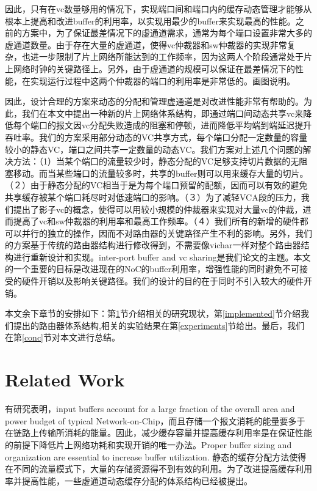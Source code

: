 ﻿\documentclass[10pt,journal]{IEEEtran}
\begin{document}
因此，只有在vc数量够用的情况下，实现端口间和端口内的缓存动态管理才能够从根本上提高和改进buffer的利用率，以实现用最少的buffer来实现最高的性能。之前的方案中\cite{NPKV06}\cite{4555894}\cite{5770788}\cite{Neishaburi:2009:RAN:1531542.1531658}\cite{6310960}，为了保证最差情况下的虚通道需求，通常为每个端口设置非常大多的虚通道数量。由于存在大量的虚通道，使得vc仲裁器和sw仲裁器的实现非常复杂，也进一步限制了片上网络所能达到的工作频率，因为这两人个阶段通常处于片上网络时钟的关键路径上。另外，由于虚通道的规模可以保证在最差情况下的性能，在实现运行过程中这两个仲裁器的端口的利用率是非常低的。画图说明。

因此，设计合理的方案来动态的分配和管理虚通道是对改进性能非常有帮助的。为此，我们在本文中提出一种新的片上网络体系结构，即通过端口间动态共享vc来降低每个端口的报文因vc分配失败造成的阻塞和停顿，进而降低平均端到端延迟提升吞吐率。我们的方案采用部分动态的VC共享方式，每个端口分配一定数量的容量较小的静态VC，端口之间共享一定数量的动态VC。我们方案对上述几个问题的解决方法：（1）当某个端口的流量较少时，静态分配的VC足够支持切片数据的无阻塞移动。而当某些端口的流量较多时，共享的buffer则可以用来缓存大量的切片。（２）由于静态分配的VC相当于是为每个端口预留的配额，因而可以有效的避免共享缓存被某个端口耗尽时对低速端口的影响。（３）为了减轻VCA段的压力，我们提出了影子vc的概念，使得可以用较小规模的仲裁器来实现对大量vc的仲裁，进而提高了vc和sw仲裁器的利用率和最高工作频率。（４）我们所有的新增的硬件都可以并行的独立的操作，因而不对路由器的关键路径产生不利的影响。另外，我们的方案基于传统的路由器结构进行修改得到，不需要像vichar一样对整个路由器结构进行重新设计和实现。inter-port buffer and vc sharing是我们论文的主题。本文的一个重要的目标是改进现在的NoC的buffer利用率，增强性能的同时避免不可接受的硬件开销以及影响关键路径。我们的设计的目的在于同时不引入较大的硬件开销。

本文余下章节的安排如下：第\ref{related}节介绍相关的研究现状，第\ref{implemented}节介绍我们提出的路由器体系结构,相关的实验结果在第\ref{experiments}节给出。最后，我们在第\ref{conc}节对本文进行总结。

\section{Related Work}\label{related}
有研究表明，input buffers account for a large fraction of the overall area and power budget of typical Network-on-Chip，而且存储一个报文消耗的能量要多于在链路上传输所消耗的能量\cite{1012681}。因此，减少缓存容量并提高缓存利用率是在保证性能的前提下降低片上网络功耗和实现开销的唯一办法。Proper buffer sizing and organization are essential to increase buffer utilization. 静态的缓存分配方法使得在不同的流量模式下，大量的存储资源得不到有效的利用。为了改进提高缓存利用率并提高性能，一些虚通道动态缓存分配的体系结构已经被提出。
\end{document}
